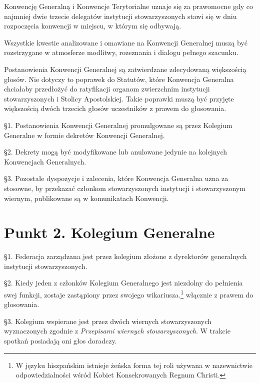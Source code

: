 

 Konwencję Generalną i Konwencje Terytorialne uznaje się za prawomocne gdy co najmniej dwie trzecie delegatów instytucji stowarzyszonych stawi się w dniu rozpoczęcia konwencji w miejscu, w którym się odbywają. 
 


 Wszystkie kwestie analizowane i omawiane na Konwencji Generalnej muszą być rozstrzygane w atmosferze modlitwy, rozeznania i dialogu pełnego szacunku.
 


 Postanowienia Konwencji Generalnej są zatwierdzane zdecydowaną większością głosów. Nie dotyczy to poprawek do Statutów, które Konwencja Generalna chciałaby przedłożyć do ratyfikacji organom zwierzchnim instytucji stowarzyszonych i Stolicy Apostolskiej. Takie poprawki muszą być przyjęte większością dwóch trzecich głosów uczestników z prawem do głosowania.
 


 \S{}1. Postanowienia Konwencji Generalnej promulgowane są przez Kolegium Generalne w formie dekretów Konwencji Generalnej.


\S{}2. Dekrety mogą być modyfikowane lub anulowane jedynie na kolejnych Konwencjach Generalnych.


\S{}3. Pozostałe dyspozycje i zalecenia, które Konwencja Generalna uzna za stosowne, by przekazać członkom stowarzyszonych instytucji i stowarzyszonym wiernym, publikowane są w komunikatach Konwencji.
 
\section{Punkt 2. Kolegium Generalne}
 


 \S{}1. Federacja zarządzana jest przez kolegium złożone z dyrektorów generalnych instytucji stowarzyszonych.


\S{}2. Kiedy jeden z członków Kolegium Generalnego jest niezdolny do pełnienia swej funkcji, zostaje zastąpiony przez swojego wikariusza.\footnote{W języku hiszpańskim istnieje żeńska forma tej roli używana w nazewnictwie odpowiedzialności wśród Kobiet Konsekrowanych Regnum  Christi.} włącznie z prawem do głosowania.


\S{}3. Kolegium wspierane jest przez dwóch wiernych stowarzyszonych wyznaczonych zgodnie z {\em Przepisami wiernych stowarzyszonych}. W trakcie spotkań posiadają oni głos doradczy.
 
